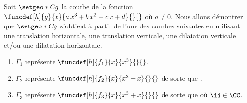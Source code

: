 Soit $\setgeo*{C}{g}$ la courbe de la fonction
$\funcdef[h]{g}{x}{a \, x^3 + b \, x^2 + c \, x + d}{}{}$
où $a\neq 0$.
Nous allons démontrer que $\setgeo*{C}{g}$ s'obtient à partir de l'une des courbes suivantes en utilisant une translation horizontale, une translation verticale, une dilatation verticale et/ou une dilatation horizontale.

\begin{enumerate}
	\item $\Gamma_1$ représente $\funcdef[h]{f_1}{x}{x^3}{}{}$.

	\item $\Gamma_2$ représente $\funcdef[h]{f_2}{x}{x^3 - x}{}{}$ de sorte que .

	\item $\Gamma_3$ représente $\funcdef[h]{f_3}{x}{x^3 + x}{}{}$ de sorte que  où $\ii \in \CC$.
\end{enumerate}




